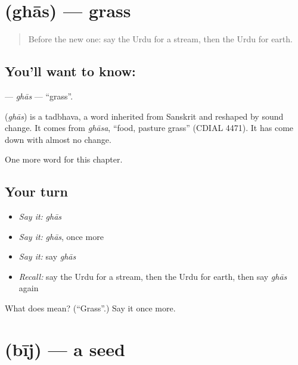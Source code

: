\section[\texorpdfstring{\ur{گھاس} (ghās)}{گھاس (ghās)}]{ (ghās) — grass}

\label{lesson:UR-C123-ghas}



\begin{quote}
Before the new one: say the Urdu for a stream, then the Urdu for earth.
\end{quote}

\subsection*{You'll want to know: }
\textbf{} — \emph{ghās} — \textquotedblleft{}grass\textquotedblright{}.

\begin{cousinweb}
\textbf{} (\emph{ghās}) is a tadbhava, a word inherited from Sanskrit and reshaped by sound change. It comes from \emph{ghāsa}, \textquotedblleft{}food, pasture grass\textquotedblright{} (CDIAL 4471). It has come down with almost no change.
\end{cousinweb}

\begin{grammarlens}[title={What you've built}]
One more word for this chapter.
\end{grammarlens}

\subsection*{Your turn}
\begin{itemize}
\raggedright
  \item \emph{Say it:} \emph{ghās}
  \item \emph{Say it:} \emph{ghās}, once more
  \item \emph{Say it:} say \emph{ghās}
  \item \emph{Recall:} say the Urdu for a stream, then the Urdu for earth, then say \emph{ghās} again
\end{itemize}

\begin{tcolorbox}[breakable,colback=teal!4,colframe=teal!35!black,title={Before you move on}]
What does  mean? (\textquotedblleft{}Grass\textquotedblright{}.) Say it once more.
\end{tcolorbox}
\section[\texorpdfstring{\ur{بیج} (bīj)}{بیج (bīj)}]{ (bīj) — a seed}

